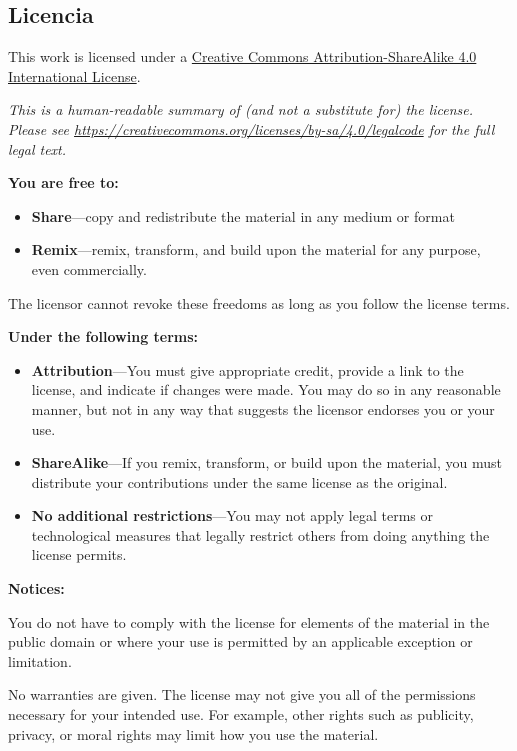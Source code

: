 \documentclass[
  a4paper,
  oneside,
  openany]{book}
\begin{document}
\hypertarget{licencia}{%
\subsection*{Licencia}\label{licencia}}


This work is licensed under a \href{https://creativecommons.org/licenses/by-sa/4.0/}{Creative Commons Attribution-ShareAlike 4.0 International License}.

\emph{This is a human-readable summary of (and not a substitute for) the license.
Please see \url{https://creativecommons.org/licenses/by-sa/4.0/legalcode} for the full legal text.}

\textbf{You are free to:}

\begin{itemize}
\item
  \textbf{Share}---copy and redistribute the material in any medium or
  format
\item
  \textbf{Remix}---remix, transform, and build upon the material for any
  purpose, even commercially.
\end{itemize}

The licensor cannot revoke these freedoms as long as you follow the
license terms.

\textbf{Under the following terms:}

\begin{itemize}
\item
  \textbf{Attribution}---You must give appropriate credit, provide a link
  to the license, and indicate if changes were made. You may do so in
  any reasonable manner, but not in any way that suggests the licensor
  endorses you or your use.
\item
  \textbf{ShareAlike}---If you remix, transform, or build upon the material, you must distribute your contributions under the same license as the original.
\item
  \textbf{No additional restrictions}---You may not apply legal terms or
  technological measures that legally restrict others from doing
  anything the license permits.
\end{itemize}

\textbf{Notices:}

You do not have to comply with the license for elements of the
material in the public domain or where your use is permitted by an
applicable exception or limitation.

No warranties are given. The license may not give you all of the
permissions necessary for your intended use. For example, other rights
such as publicity, privacy, or moral rights may limit how you use the
material.
\end{document}
